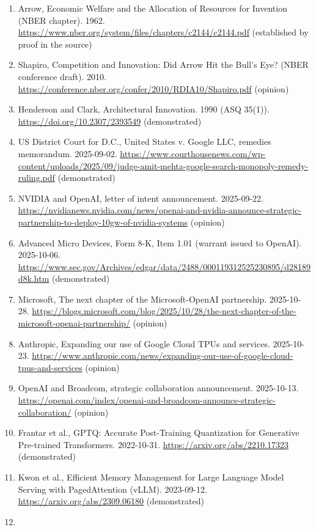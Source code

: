 \documentclass[10pt,letterpaper]{article}
\begin{document}
\begin{enumerate}
  (demonstrated)
\item
  Arrow, Economic Welfare and the Allocation of Resources for Invention
  (NBER chapter). 1962.
  \url{https://www.nber.org/system/files/chapters/c2144/c2144.pdf}
  (established by proof in the source)
\item
  Shapiro, Competition and Innovation: Did Arrow Hit the Bull's Eye?
  (NBER conference draft). 2010.
  \url{https://conference.nber.org/confer/2010/RDIA10/Shapiro.pdf}
  (opinion)
\item
  Henderson and Clark, Architectural Innovation. 1990 (ASQ 35(1)).
  \url{https://doi.org/10.2307/2393549} (demonstrated)
\item
  US District Court for D.C., United States v. Google LLC, remedies
  memorandum. 2025-09-02.
  \url{https://www.courthousenews.com/wp-content/uploads/2025/09/judge-amit-mehta-google-search-monopoly-remedy-ruling.pdf}
  (demonstrated)
\item
  NVIDIA and OpenAI, letter of intent announcement. 2025-09-22.
  \url{https://nvidianews.nvidia.com/news/openai-and-nvidia-announce-strategic-partnership-to-deploy-10gw-of-nvidia-systems}
  (opinion)
\item
  Advanced Micro Devices, Form 8-K, Item 1.01 (warrant issued to
  OpenAI). 2025-10-06.
  \url{https://www.sec.gov/Archives/edgar/data/2488/000119312525230895/d28189d8k.htm}
  (demonstrated)
\item
  Microsoft, The next chapter of the Microsoft-OpenAI partnership.
  2025-10-28.
  \url{https://blogs.microsoft.com/blog/2025/10/28/the-next-chapter-of-the-microsoft-openai-partnership/}
  (opinion)
\item
  Anthropic, Expanding our use of Google Cloud TPUs and services.
  2025-10-23.
  \url{https://www.anthropic.com/news/expanding-our-use-of-google-cloud-tpus-and-services}
  (opinion)
\item
  OpenAI and Broadcom, strategic collaboration announcement. 2025-10-13.
  \url{https://openai.com/index/openai-and-broadcom-announce-strategic-collaboration/}
  (opinion)
\item
  Frantar et al., GPTQ: Accurate Post-Training Quantization for
  Generative Pre-trained Transformers. 2022-10-31.
  \url{https://arxiv.org/abs/2210.17323} (demonstrated)
\item
  Kwon et al., Efficient Memory Management for Large Language Model
  Serving with PagedAttention (vLLM). 2023-09-12.
  \url{https://arxiv.org/abs/2309.06180} (demonstrated)
\item

\end{enumerate}
\end{document}
